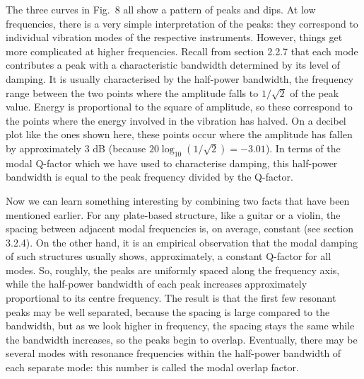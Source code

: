 
  The three curves in Fig.\ 8 all show a pattern of peaks and dips. At low 
  frequencies, there is a very simple interpretation of the peaks: they 
  correspond to individual vibration modes of the respective instruments. 
  However, things get more complicated at higher frequencies. Recall from 
  section 2.2.7 that each mode contributes a peak with a characteristic 
  bandwidth determined by its level of damping. It is usually characterised by 
  the half-power bandwidth, the frequency range between the two points where 
  the amplitude falls to $1/\sqrt{2}$ of the peak value. Energy is proportional 
  to the square of amplitude, so these correspond to the points where the 
  energy involved in the vibration has halved. On a decibel plot like the ones 
  shown here, these points occur where the amplitude has fallen by 
  approximately 3 dB (because $20 \log_{10} (1/\sqrt{2}) = -3.01$). In terms of 
  the modal Q-factor which we have used to characterise damping, this 
  half-power bandwidth is equal to the peak frequency divided by the Q-factor. 

  Now we can learn something interesting by combining two facts that have been 
  mentioned earlier. For any plate-based structure, like a guitar or a violin, 
  the spacing between adjacent modal frequencies is, on average, constant (see 
  section 3.2.4). On the other hand, it is an empirical observation that the 
  modal damping of such structures usually shows, approximately, a constant 
  Q-factor for all modes. So, roughly, the peaks are uniformly spaced along the 
  frequency axis, while the half-power bandwidth of each peak increases 
  approximately proportional to its centre frequency. The result is that the 
  first few resonant peaks may be well separated, because the spacing is large 
  compared to the bandwidth, but as we look higher in frequency, the spacing 
  stays the same while the bandwidth increases, so the peaks begin to overlap. 
  Eventually, there may be several modes with resonance frequencies within the 
  half-power bandwidth of each separate mode: this number is called the modal 
  overlap factor. 

